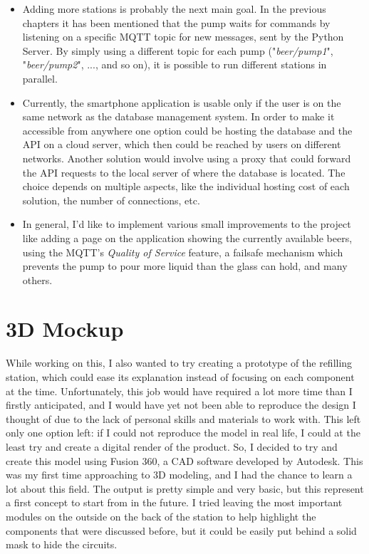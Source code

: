 \documentclass[target=bach,aauheader=,style=]{thud}
\begin{document}
\begin{itemize}
	\item Adding more stations is probably the next main goal. In the previous chapters it has been mentioned that the pump waits for commands by listening on a specific MQTT topic for new messages, sent by the Python Server. By simply using a different topic for each pump ("\emph{beer/pump1}", "\emph{beer/pump2}", ..., and so on), it is possible to run different stations in parallel.
	\item Currently, the smartphone application is usable only if the user is on the same network as the database management system. In order to make it accessible from anywhere one option could be hosting the database and the API on a cloud server, which then could be reached by users on different networks. Another solution would involve using a proxy that could forward the API requests to the local server of where the database is located.
	The choice depends on multiple aspects, like the individual hosting cost of each solution, the number of connections, etc.
	\item In general, I'd like to implement various small improvements to the project like adding a page on the application showing the currently available beers, using the MQTT's \emph{Quality of Service} feature, a failsafe mechanism which prevents the pump to pour more liquid than the glass can hold, and many others.
\end{itemize}







\section{3D Mockup}
While working on this, I also wanted to try creating a prototype of the refilling station, which could ease its explanation instead of focusing on each component at the time. Unfortunately, this job would have required a lot more time than I firstly anticipated, and I would have yet not been able to reproduce the design I thought of due to the lack of personal skills and materials to work with. This left only one option left: if I could not reproduce the model in real life, I could at the least try and create a digital render of the product. 
So, I decided to try and create this model using Fusion 360, a CAD software developed by Autodesk.
This was my first time approaching to 3D modeling, and I had the chance to learn a lot about this field. The output is pretty simple and very basic, but this represent a first concept to start from in the future.
I tried leaving the most important modules on the outside on the back of the station to help highlight the components that were discussed before, but it could be easily put behind a solid mask to hide the circuits.
\end{document}
